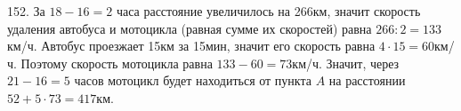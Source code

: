 152. За $18-16=2$ часа расстояние увеличилось на 266км, значит скорость удаления автобуса и мотоцикла (равная сумме их скоростей) равна $266:2=133$км/ч. Автобус проезжает 15км за 15мин, значит его скорость равна $4\cdot15=60$км/ч. Поэтому скорость мотоцикла равна $133-60=73$км/ч. Значит, через $21-16=5$ часов мотоцикл будет находиться от пункта $A$ на расстоянии $52+5\cdot73=417$км.\\
